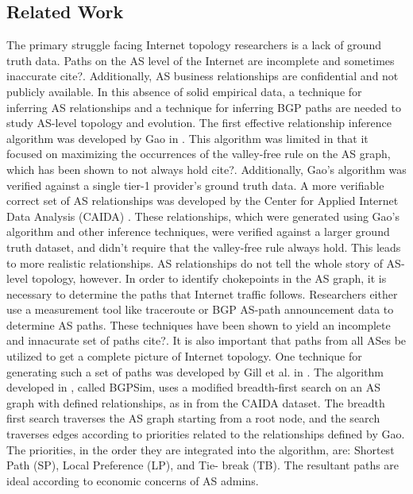 \documentclass{article}
\begin{document}
\begin{multicols}{2}
\section{Related Work}
The primary struggle facing Internet topology researchers is
a lack of ground truth data. Paths on the AS level of the Internet are
incomplete and sometimes inaccurate {\color{blue}cite?}. Additionally, AS business
relationships are confidential and not publicly available. In this absence of
solid empirical data, a technique for inferring AS relationships and a
technique for inferring BGP paths are needed to study AS-level topology and
evolution. The first effective relationship inference algorithm was developed
by Gao in \cite{gao}. This algorithm was limited in that it focused on
maximizing the occurrences of the valley-free rule on the AS graph, which has
been shown to not always hold {\color{blue}cite?}. Additionally, Gao's algorithm was
verified against a single tier-1 provider's ground truth data. A more
verifiable correct set of AS relationships was developed by the Center for
Applied Internet Data Analysis (CAIDA) \cite{CAIDApaper}. These relationships,
which were generated using Gao's algorithm and other inference techniques,
were verified against a larger ground truth dataset, and didn't require that
the valley-free rule always hold. This leads to more realistic relationships. AS
relationships do not tell the whole story of AS-level topology, however. In
order to identify chokepoints in the AS graph, it is necessary to determine
the paths that Internet traffic follows. Researchers either use a measurement
tool like traceroute or BGP AS-path announcement data to determine AS paths.
These techniques have been shown to yield an incomplete and innacurate set of
paths {\color{blue}cite?}. It is also important that paths from all ASes be utilized to
get a complete picture of Internet topology. One technique for generating such
a set of paths was developed by Gill et al. in \cite{quicksand}. The algorithm
developed in \cite{quicksand}, called BGPSim, uses a modified breadth-first
search on an AS graph with defined relationships, as in from the CAIDA
dataset. The breadth first search traverses the AS graph starting from a root
node, and the search traverses edges according to priorities related to the
relationships defined by Gao. The priorities, in the order they are integrated
into the algorithm, are: Shortest Path (SP), Local Preference (LP), and Tie-
break (TB). The resultant paths are ideal according to economic concerns of AS
admins.     
\par

\end{multicols}
\end{document}
